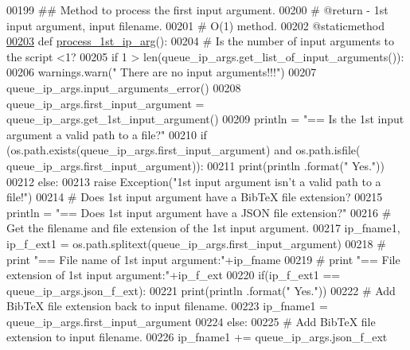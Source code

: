 \begin{DoxyCode}
00199     \textcolor{comment}{##  Method to process the first input argument.}
00200     \textcolor{comment}{#   @return - 1st input argument, input filename.}
00201     \textcolor{comment}{#   O(1) method.}
00202     @staticmethod
\hypertarget{queue__ip__arguments_8py_source_l00203}{}\hyperlink{classutilities_1_1queue__ip__arguments_1_1queue__ip__args_ae1fc6d7af2e429d0656dbf388711db94}{00203}     \textcolor{keyword}{def }\hyperlink{classutilities_1_1queue__ip__arguments_1_1queue__ip__args_ae1fc6d7af2e429d0656dbf388711db94}{process\_1st\_ip\_arg}():
00204         \textcolor{comment}{#   Is the number of input arguments to the script <1?}
00205         \textcolor{keywordflow}{if} 1 > len(queue\_ip\_args.get\_list\_of\_input\_arguments()):
00206             warnings.warn(\textcolor{stringliteral}{" There are no input arguments!!!"})
00207             queue\_ip\_args.input\_arguments\_error()
00208         queue\_ip\_args.first\_input\_argument = queue\_ip\_args.get\_1st\_input\_argument()
00209         println = \textcolor{stringliteral}{"==   Is the 1st input argument a valid path to a file?"}
00210         \textcolor{keywordflow}{if} (os.path.exists(queue\_ip\_args.first\_input\_argument) \textcolor{keywordflow}{and} os.path.isfile(
      queue\_ip\_args.first\_input\_argument)):
00211             print(println .format(\textcolor{stringliteral}{" Yes."}))
00212         \textcolor{keywordflow}{else}:
00213             \textcolor{keywordflow}{raise} Exception(\textcolor{stringliteral}{"1st input argument isn't a valid path to a file!"})
00214         \textcolor{comment}{#   Does 1st input argument have a BibTeX file extension?}
00215         println = \textcolor{stringliteral}{"==   Does 1st input argument have a JSON file extension?"}
00216         \textcolor{comment}{#   Get the filename and file extension of the 1st input argument.}
00217         ip\_fname1, ip\_f\_ext1 = os.path.splitext(queue\_ip\_args.first\_input\_argument)
00218 \textcolor{comment}{#   print "==   File name of 1st input argument:"+ip\_fname}
00219 \textcolor{comment}{#   print "==   File extension of 1st input argument:"+ip\_f\_ext}
00220         if(ip\_f\_ext1 == queue\_ip\_args.json\_f\_ext):
00221             print(println .format(\textcolor{stringliteral}{" Yes."}))
00222             \textcolor{comment}{#   Add BibTeX file extension back to input filename.}
00223             ip\_fname1 = queue\_ip\_args.first\_input\_argument
00224         \textcolor{keywordflow}{else}:
00225             \textcolor{comment}{#   Add BibTeX file extension to input filename.}
00226             ip\_fname1 += queue\_ip\_args.json\_f\_ext

\end{DoxyCode}
